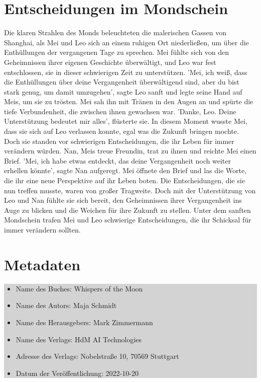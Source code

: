 \documentclass[12pt]{article} %
\begin{document}
\section{ Entscheidungen im Mondschein }
\begin{minipage}{\textwidth}
    Die klaren Strahlen des Monds beleuchteten die malerischen Gassen von Shanghai, als Mei und Leo sich an einem ruhigen Ort niederließen, um über die Enthüllungen der vergangenen Tage zu sprechen. Mei fühlte sich von den Geheimnissen ihrer eigenen Geschichte überwältigt, und Leo war fest entschlossen, sie in dieser schwierigen Zeit zu unterstützen. 'Mei, ich weiß, dass die Enthüllungen über deine Vergangenheit überwältigend sind, aber du bist stark genug, um damit umzugehen', sagte Leo sanft und legte seine Hand auf Meis, um sie zu trösten. Mei sah ihn mit Tränen in den Augen an und spürte die tiefe Verbundenheit, die zwischen ihnen gewachsen war. 'Danke, Leo. Deine Unterstützung bedeutet mir alles', flüsterte sie. In diesem Moment wusste Mei, dass sie sich auf Leo verlassen konnte, egal was die Zukunft bringen mochte. Doch sie standen vor schwierigen Entscheidungen, die ihr Leben für immer verändern würden. Nan, Meis treue Freundin, trat zu ihnen und reichte Mei einen Brief. 'Mei, ich habe etwas entdeckt, das deine Vergangenheit noch weiter erhellen könnte', sagte Nan aufgeregt. Mei öffnete den Brief und las die Worte, die ihr eine neue Perspektive auf ihr Leben boten. Die Entscheidungen, die sie nun treffen musste, waren von großer Tragweite. Doch mit der Unterstützung von Leo und Nan fühlte sie sich bereit, den Geheimnissen ihrer Vergangenheit ins Auge zu blicken und die Weichen für ihre Zukunft zu stellen. Unter dem sanften Mondschein trafen Mei und Leo schwierige Entscheidungen, die ihr Schicksal für immer verändern sollten.
\end{minipage}

\clearpage
\section*{Metadaten}
\begin{minipage}{\textwidth}
    \colorbox{lightgray}{
        \begin{minipage}{\dimexpr\textwidth-2\fboxsep}
            \vspace{4cm}
            \begin{itemize}
                \item Name des Buches: Whispers of the Moon
                \item Name des Autors: Maja Schmidt
                \item Name des Herausgebers: Mark Zimmermann
                \item Name des Verlags: HdM AI Technologies
                \item Adresse des Verlags: Nobelstraße 10, 70569 Stuttgart
                \item Datum der Veröffentlichung: 2022-10-20
            \end{itemize}
            \vspace{4cm}
        \end{minipage}

    }
\end{minipage}
\end{document}
